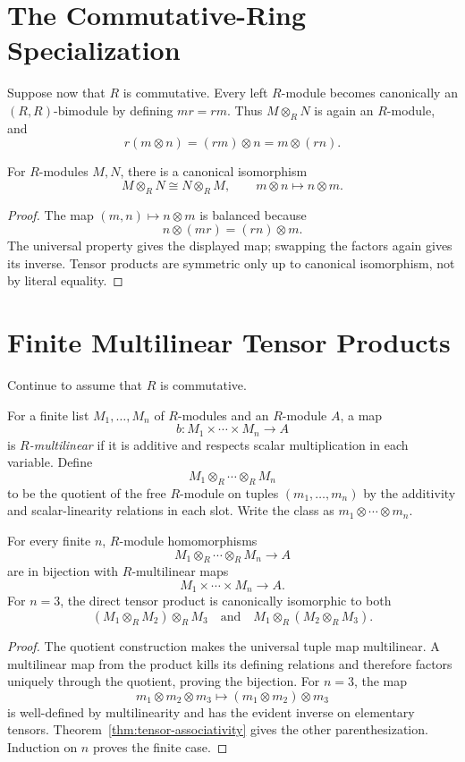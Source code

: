 \section{The Commutative-Ring Specialization}\label{sec:commutative-tensors}
Suppose now that \(R\) is commutative. Every left \(R\)-module becomes
canonically an \((R,R)\)-bimodule by defining \(mr=rm\). Thus
\(M\otimes_RN\) is again an \(R\)-module, and
\[
r(m\otimes n)=(rm)\otimes n=m\otimes(rn).
\]

\begin{proposition}[Symmetry]\label{prop:tensor-symmetry}
For \(R\)-modules \(M,N\), there is a canonical isomorphism
\[
M\otimes_RN\cong N\otimes_RM,
\qquad
m\otimes n\longmapsto n\otimes m.
\]
\end{proposition}
\begin{proof}
The map \((m,n)\mapsto n\otimes m\) is balanced because
\[
n\otimes(mr)=(rn)\otimes m.
\]
The universal property gives the displayed map; swapping the factors again
gives its inverse. Tensor products are symmetric only up to canonical
isomorphism, not by literal equality.
\end{proof}

\section{Finite Multilinear Tensor Products}\label{sec:multilinear-tensors}
Continue to assume that \(R\) is commutative.

For a finite list \(M_1,\ldots,M_n\) of \(R\)-modules and an \(R\)-module
\(A\), a map
\[
b:M_1\times\cdots\times M_n\longrightarrow A
\]
is \emph{\(R\)-multilinear} if it is additive and respects scalar
multiplication in each variable. Define
\[
M_1\otimes_R\cdots\otimes_RM_n
\]
to be the quotient of the free \(R\)-module on tuples
\((m_1,\ldots,m_n)\) by the additivity and scalar-linearity relations in each
slot. Write the class as \(m_1\otimes\cdots\otimes m_n\).

\begin{theorem}\label{thm:finite-tensors}
For every finite \(n\), \(R\)-module homomorphisms
\[
M_1\otimes_R\cdots\otimes_RM_n\longrightarrow A
\]
are in bijection with \(R\)-multilinear maps
\[
M_1\times\cdots\times M_n\longrightarrow A.
\]
For \(n=3\), the direct tensor product is canonically isomorphic to both
\[
(M_1\otimes_RM_2)\otimes_RM_3
\quad\text{and}\quad
M_1\otimes_R(M_2\otimes_RM_3).
\]
\end{theorem}
\begin{proof}
The quotient construction makes the universal tuple map multilinear. A
multilinear map from the product kills its defining relations and therefore
factors uniquely through the quotient, proving the bijection. For \(n=3\),
the map
\[
m_1\otimes m_2\otimes m_3
\longmapsto
(m_1\otimes m_2)\otimes m_3
\]
is well-defined by multilinearity and has the evident inverse on elementary
tensors. Theorem~\ref{thm:tensor-associativity} gives the other
parenthesization. Induction on \(n\) proves the finite case.
\end{proof}

